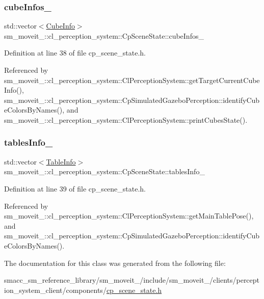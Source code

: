 \subsubsection{\texorpdfstring{cube\+Infos\+\_\+}{cubeInfos\_}}
{\footnotesize\ttfamily std\+::vector$<$\hyperlink{structsm__moveit__4_1_1cl__perception__system_1_1CubeInfo}{Cube\+Info}$>$ sm\+\_\+moveit\+\_\+::cl\+\_\+perception\+\_\+system\+::\+Cp\+Scene\+State\+::cube\+Infos\+\_\+}



Definition at line 38 of file cp\+\_\+scene\+\_\+state.\+h.



Referenced by sm\+\_\+moveit\+\_\+::cl\+\_\+perception\+\_\+system\+::\+Cl\+Perception\+System\+::get\+Target\+Current\+Cube\+Info(), sm\+\_\+moveit\+\_\+::cl\+\_\+perception\+\_\+system\+::\+Cp\+Simulated\+Gazebo\+Perception\+::identify\+Cube\+Colors\+By\+Names(), and sm\+\_\+moveit\+\_\+::cl\+\_\+perception\+\_\+system\+::\+Cl\+Perception\+System\+::print\+Cubes\+State().

\mbox{\label{classsm__moveit__4_1_1cl__perception__system_1_1CpSceneState_a95f74dd16566d97e017650ccdf4b8a46}} 
\subsubsection{\texorpdfstring{tables\+Info\+\_\+}{tablesInfo\_}}
{\footnotesize\ttfamily std\+::vector$<$\hyperlink{structsm__moveit__4_1_1cl__perception__system_1_1TableInfo}{Table\+Info}$>$ sm\+\_\+moveit\+\_\+::cl\+\_\+perception\+\_\+system\+::\+Cp\+Scene\+State\+::tables\+Info\+\_\+}



Definition at line 39 of file cp\+\_\+scene\+\_\+state.\+h.



Referenced by sm\+\_\+moveit\+\_\+::cl\+\_\+perception\+\_\+system\+::\+Cl\+Perception\+System\+::get\+Main\+Table\+Pose(), and sm\+\_\+moveit\+\_\+::cl\+\_\+perception\+\_\+system\+::\+Cp\+Simulated\+Gazebo\+Perception\+::identify\+Cube\+Colors\+By\+Names().



The documentation for this class was generated from the following file\+:\begin{DoxyCompactItemize}
\item 
smacc\+\_\+sm\+\_\+reference\+\_\+library/sm\+\_\+moveit\+\_/include/sm\+\_\+moveit\+\_/clients/perception\+\_\+system\+\_\+client/components/\hyperlink{cp__scene__state_8h}{cp\+\_\+scene\+\_\+state.\+h}\end{DoxyCompactItemize}
